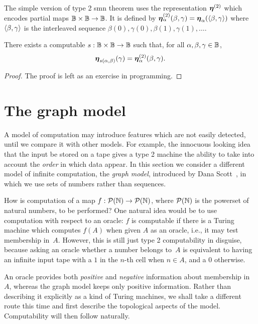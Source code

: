 The simple version of type 2 smn theorem uses the representation
$\text{\boldmath{$\eta$}}^{(2)}$ which encodes partial maps $\mathbb{B} \times \mathbb{B} \to
\mathbb{B}$. It is defined by $\text{\boldmath{$\eta$}}^{(2)}_{\alpha}(\beta, \gamma) =
\text{\boldmath{$\eta$}}_{\alpha}(\langle \beta, \gamma \rangle)$ where $\langle \beta, \gamma \rangle$ is
the interleaved sequence $\beta(0), \gamma(0), \beta(1), \gamma(1),
\ldots$.

\begin{theorem}
  There exists a computable $s : \mathbb{B} \times \mathbb{B} \to \mathbb{B}$ such
  that, for all $\alpha, \beta, \gamma \in \mathbb{B}$,
  \begin{equation*}
    \text{\boldmath{$\eta$}}_{s(\alpha, \beta)}(\gamma) = \text{\boldmath{$\eta$}}^{(2)}_{\alpha}(\beta, \gamma).
  \end{equation*}
\end{theorem}

\begin{proof}
  The proof is left as an exercise in programming.
\end{proof}


\section{The graph model}
\label{sec:graph-model}

A model of computation may introduce features which are not easily
detected, until we compare it with other models. For example, the
innocuous looking idea that the input be stored on a tape gives a type
2 machine the ability to take into account the \emph{order} in which
data appear. In this section we consider a different model of infinite
computation, the \emph{graph model}, introduced by Dana
Scott~\cite{ScottD:dattl}, in which we use sets of numbers rather than
sequences.

How is computation of a map $f : \mathcal{P}(\mathbb{N}) \to \mathcal{P}(\mathbb{N})$, where
$\mathcal{P}(\mathbb{N})$ is the powerset of natural numbers, to be performed? One
natural idea would be to use computation with respect to an oracle:
$f$ is computable if there is a Turing machine which computes $f(A)$
when given $A$ as an oracle, i.e., it may test membership in~$A$.
However, this is still just type 2 computability in disguise, because
asking an oracle whether a number belongs to~$A$ is equivalent to
having an infinite input tape with a $1$ in the $n$-th cell when $n
\in A$, and a $0$ otherwise.

An oracle provides both \emph{positive} and \emph{negative}
information about membership in~$A$, whereas the graph model keeps
only positive information. Rather than describing it explicitly as a
kind of Turing machines, we shall take a different route this time and
first describe the topological aspects of the model. Computability
will then follow naturally.

